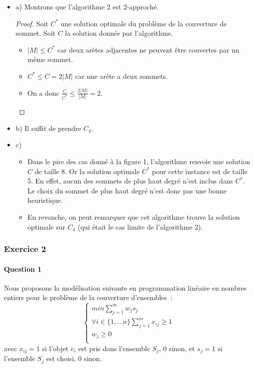 \documentclass[a4paper, 12pt]{article}
\begin{document}
\begin{itemize}
\item[] a) Montrons que l'algorithme 2 est 2-approché.
\begin{proof}
Soit $C^{*}$ une solution optimale du problème de la couverture de
sommet. Soit $C$ la solution donnée par l'algorithme. 
\begin{itemize}
\item[] $|M| \leq C^{*}$ car deux arêtes adjacentes ne peuvent être
  couvertes par un même sommet.
\item[] $C^{*} \leq C = 2 |M|$ car une arête a deux sommets.
\item[] On a donc $\frac{C}{C^{*}} \leq \frac{2|M|}{|M|} = 2$.
\end{itemize}
\end{proof}
\item[] b) Il suffit de prendre $C_4$.
\item[] c) 
\begin{itemize}
\item[] Dans le pire des cas donné à la figure 1, l'algorithme renvoie
  une solution $C$ de taille 8. Or la solution optimale $C^*$ pour cette
  instance est de taille 5. En effet, aucun des sommets de plus haut
  degré n'est inclus dans $C^{*}$. Le choix du sommet de plus haut
  degré n'est donc pas une bonne heuristique. 
\item[] En revanche, on peut remarquer que cet algorithme trouve la
  solution optimale sur $C_4$ (qui était le cas limite de l'algorithme 2).
\end{itemize}
\end{itemize}

\subsubsection*{Exercice 2}

\paragraph{Question 1}

Nous proposons la modélisation suivante en programmation linéaire en
nombres entiers pour le problème de la couverture d'ensembles~:
\begin{equation}
\begin{cases}
min \sum_{j=1}^m w_j s_j\\
\forall i \in \{1, \dots n \} \sum_{j=1}^{m} x_{ij} \geq 1 \\
w_j \geq 0 \\
\end{cases}
\end{equation}
avec $x_{ij} = 1$ si l'objet $e_i$ est pris dans l'ensemble $S_j$, 0
sinon, et $s_j = 1$ si l'ensemble $S_j$ est choisi, 0 sinon.
\end{document}
